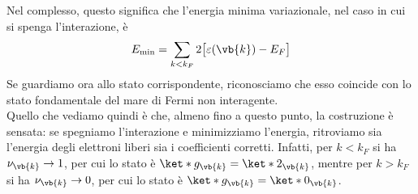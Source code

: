 Nel complesso, questo significa che l'energia minima variazionale, nel caso in cui si spenga l'interazione, è
\begin{equation*}
   E_{\rm min}
   =\sum_{k < k_F} 2 \bigl[ \varepsilon(\vb{k}) - E_F \bigr]
\end{equation*}
Se guardiamo ora allo stato corrispondente, riconosciamo che esso coincide con lo stato fondamentale del mare di Fermi non interagente.\\
Quello che vediamo quindi è che, almeno fino a questo punto, la costruzione è sensata: se spegniamo l'interazione e minimizziamo l'energia, ritroviamo sia l'energia degli elettroni liberi sia i coefficienti corretti. Infatti, per $k < k_F$ si ha $\nu_{\vb{k}} \to 1$, per cui lo stato è $\ket*{g_{\vb{k}}}=\ket*{2_{\vb{k}}}$, mentre per $k > k_F$ si ha $\nu_{\vb{k}} \to 0$, per cui lo stato è $\ket*{g_{\vb{k}}}=\ket*{0_{\vb{k}}}$.
